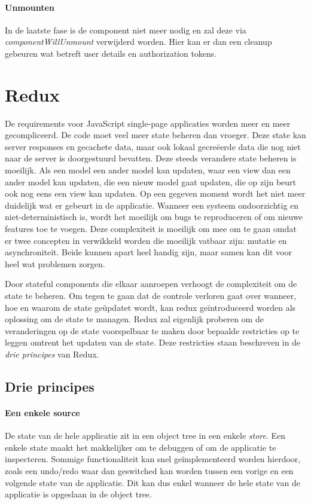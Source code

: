\paragraph{Unmounten}
In de laatste fase is de component niet meer nodig en zal deze via \textit{componentWillUnmount} verwijderd worden. Hier kan er dan een cleanup gebeuren wat betreft user details en authorization tokens.
\autocite{reactlifecycle}
\autocite{reactlifecycle2}


\section{Redux}
De requirements voor JavaScript single-page applicaties worden meer en meer gecompliceerd. De code moet veel meer state beheren dan vroeger. Deze state kan server responses en gecachete data, maar ook lokaal gecreëerde data die nog niet naar de server is doorgestuurd bevatten. Deze steeds verandere state beheren is moeilijk. Als een model een ander model kan updaten, waar een view dan een ander model kan updaten, die een nieuw model gaat updaten, die op zijn beurt ook nog eens een view kan updaten. Op een gegeven moment wordt het niet meer duidelijk wat er gebeurt in de applicatie. Wanneer een systeem ondoorzichtig en niet-deterministisch is, wordt het moeilijk om bugs te reproduceren of om nieuwe features toe te voegen. Deze complexiteit is moeilijk om mee om te gaan omdat er twee concepten in verwikkeld worden die moeilijk vatbaar zijn: mutatie en asynchroniteit. Beide kunnen apart heel handig zijn, maar samen kan dit voor heel wat problemen zorgen.

Door stateful components die elkaar aanroepen verhoogt de complexiteit om de state te beheren. Om tegen te gaan dat de controle verloren gaat over wanneer, hoe en waarom de state geüpdatet wordt, kan redux geïntroduceerd worden als oplossing om de state te managen. Redux zal eigenlijk proberen om de veranderingen op de state voorspelbaar te maken door bepaalde restricties op te leggen omtrent het updaten van de state. Deze restricties staan beschreven in de \textit{drie principes} van Redux.

\subsection{Drie principes}

\paragraph{Een enkele source}  
De state van de hele applicatie zit in een object tree in een enkele \textit{store}. Een enkele state maakt het makkelijker om te debuggen of om de applicatie te inspecteren. Sommige functionaliteit kan snel geïmplementeerd worden hierdoor, zoals een undo/redo waar dan geswitched kan worden tussen een vorige en een volgende state van de applicatie. Dit kan dus enkel wanneer de hele state van de applicatie is opgeslaan in de object tree.

